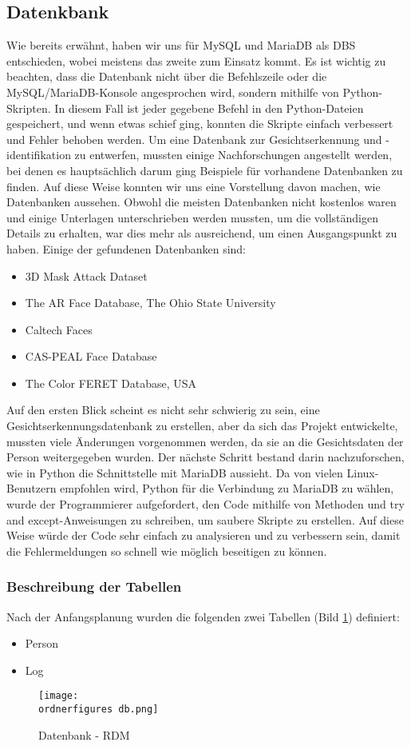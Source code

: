 \subsection{Datenkbank}
Wie bereits erwähnt, haben wir uns für MySQL und MariaDB als DBS entschieden, wobei meistens das zweite zum Einsatz kommt. Es ist wichtig zu beachten, dass die Datenbank nicht über die Befehlszeile oder die MySQL/MariaDB-Konsole angesprochen wird, sondern mithilfe von Python-Skripten. In diesem Fall ist jeder gegebene Befehl in den Python-Dateien gespeichert, und wenn etwas schief ging, konnten die Skripte einfach verbessert und Fehler behoben werden.
\bigbreak
Um eine Datenbank zur Gesichtserkennung und -identifikation zu entwerfen, mussten einige Nachforschungen angestellt werden, bei denen es hauptsächlich darum ging Beispiele für vorhandene Datenbanken zu finden. Auf diese Weise konnten wir uns eine Vorstellung davon machen, wie Datenbanken aussehen. Obwohl die meisten Datenbanken nicht kostenlos waren und einige Unterlagen unterschrieben werden mussten, um die vollständigen Details zu erhalten, war dies mehr als ausreichend, um einen Ausgangspunkt zu haben. Einige der gefundenen Datenbanken sind:
\begin{itemize}
	\item 3D Mask Attack Dataset\cite{Database1}
	\item The AR Face Database, The Ohio State University\cite{Database2}
	\item Caltech Faces\cite{Database3}
	\item CAS-PEAL Face Database\cite{Database4}
	\item The Color FERET Database, USA\cite{Database5}
\end{itemize}
Auf den ersten Blick scheint es nicht sehr schwierig zu sein, eine Gesichtserkennungsdatenbank zu erstellen, aber da sich das Projekt entwickelte, mussten viele Änderungen vorgenommen werden, da sie an die Gesichtsdaten der Person weitergegeben wurden.
\bigbreak
Der nächste Schritt bestand darin nachzuforschen, wie in Python die Schnittstelle mit MariaDB aussieht. Da von vielen Linux-Benutzern empfohlen wird, Python für die Verbindung zu MariaDB zu wählen, wurde der Programmierer aufgefordert, den Code mithilfe von Methoden und try and except-Anweisungen zu schreiben, um saubere Skripte zu erstellen. Auf diese Weise würde der Code sehr einfach zu analysieren und zu verbessern sein, damit die Fehlermeldungen so schnell wie möglich beseitigen zu können.
\subsubsection{Beschreibung der Tabellen}
Nach der Anfangsplanung wurden die folgenden zwei Tabellen (Bild \ref{fig:datenbank}) definiert:
\begin{itemize}
	\item Person
	\item Log
\end{itemize}
\begin{figure}[!htb]
  \centering
    \texttt{[image: \\ordnerfigures db.png]}
      \caption{Datenbank - RDM}
      \label{fig:datenbank}
\end{figure}
